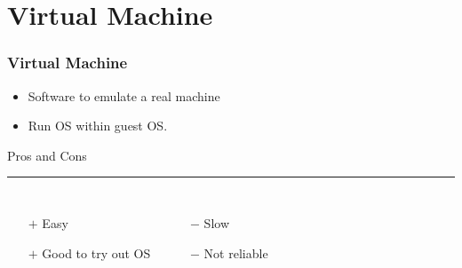 \section{Virtual Machine}
\begin{frame}
	\frametitle{Virtual Machine}

    \begin{itemize}
    	\item Software to emulate a real machine
        \item Run OS within guest OS.
    \end{itemize} \vspace{0.5cm}
    
    Pros and Cons \vspace{0.1cm}
    \hrule 
    \begin{columns}[c]
            \begin{enumerate}
            	\item[$+$] Easy
                \item[$+$] Good  to try out OS
            \end{enumerate}
            \begin{enumerate}
            	\item[$-$] Slow
                \item[$-$] Not reliable
            \end{enumerate}
    \end{columns} \vspace{0.5cm}
	
	\begin{itemize}
		\item[] 
		\item[] 
	\end{itemize}
    
\end{frame}


